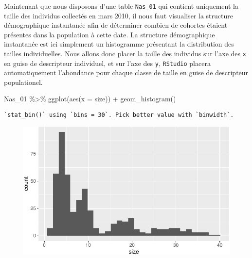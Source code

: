 \documentclass[
  a4paper,
  DIV=11,
  numbers=noendperiod,
  oneside]{scrreprt}
\newenvironment{Shaded}{}{}
\newcommand{\AttributeTok}[1]{\textcolor[rgb]{0.84,0.23,0.29}{#1}}
\newcommand{\FunctionTok}[1]{\textcolor[rgb]{0.44,0.26,0.76}{#1}}
\newcommand{\NormalTok}[1]{\textcolor[rgb]{0.14,0.16,0.18}{#1}}
\newcommand{\SpecialCharTok}[1]{\textcolor[rgb]{0.00,0.36,0.77}{#1}}
\begin{document}
Maintenant que nous disposons d'une table \texttt{Nas\_01} qui contient
uniquement la taille des individus collectés en mars 2010, il nous faut
visualiser la structure démographique instantanée afin de déterminer
combien de cohortes étaient présentes dans la population à cette date.
La structure démographique instantanée est ici simplement un histogramme
présentant la distribution des tailles individuelles. Nous allons donc
placer la taille des individus sur l'axe des \texttt{x} en guise de
descripteur individuel, et sur l'axe des \texttt{y}, \texttt{RStudio}
placera automatiquement l'abondance pour chaque classe de taille en
guise de descripteur populationel.

\begin{Shaded}
\begin{Highlighting}[]
\NormalTok{Nas\_01 }\SpecialCharTok{\%\textgreater{}\%}
  \FunctionTok{ggplot}\NormalTok{(}\FunctionTok{aes}\NormalTok{(}\AttributeTok{x =}\NormalTok{ size)) }\SpecialCharTok{+}
  \FunctionTok{geom\_histogram}\NormalTok{()}
\end{Highlighting}
\end{Shaded}

\begin{verbatim}
`stat_bin()` using `bins = 30`. Pick better value with `binwidth`.
\end{verbatim}

\begin{figure}[H]


{\centering \includegraphics{04-Cohortes_files/figure-pdf/fig-histo1-1.pdf}

}

\end{figure}
\end{document}
